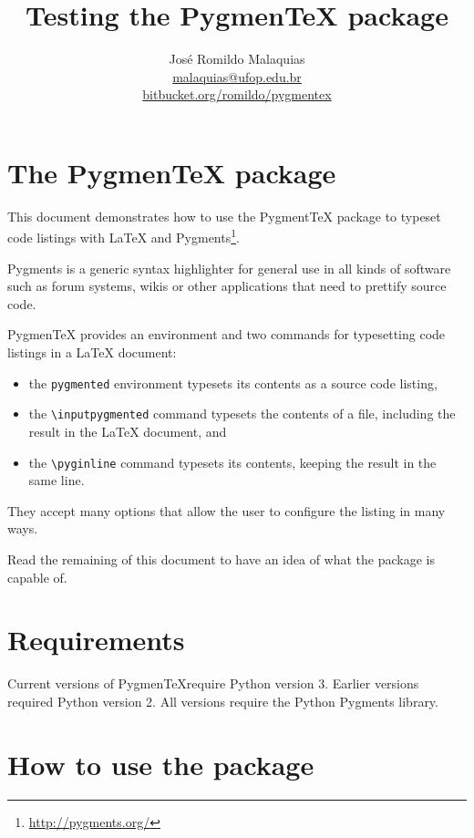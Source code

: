 \documentclass[10pt,a4paper]{article}
\begin{document}
\title{Testing the Pygmen\TeX{} package}
\author{José Romildo Malaquias\\
\href{mailto:malaquias@ufop.edu.br}{malaquias@ufop.edu.br}\\
\href{https://bitbucket.org/romildo/pygmentex/src/master/}{bitbucket.org/romildo/pygmentex}
}
\maketitle

\section{The Pygmen\TeX{} package}

This document demonstrates how to use the Pygment\TeX{} package to
typeset code listings with \LaTeX{} and
Pygments\footnote{\url{http://pygments.org/}}.

Pygments is a generic syntax highlighter for general use in all kinds of
software such as forum systems, wikis or other applications that need to
prettify source code.

Pygmen\TeX{} provides an environment and two commands for typesetting code
listings in a \LaTeX{} document:
\begin{itemize}
  \item the \verb|pygmented| environment typesets its contents as a
  source code listing,
  \item the \verb|\inputpygmented| command typesets the contents of a
  file, including the result in the \LaTeX{} document, and
  \item the \verb|\pyginline| command typesets its contents, keeping the
  result in the same line.
\end{itemize}
They accept many options that allow the user to configure the listing in
many ways.

Read the remaining of this document to have an idea of what the package
is capable of.

\section{Requirements}

Current versions of Pygmen\TeX require Python version 3.  Earlier versions
required Python version 2.  All versions require the Python Pygments library.

\section{How to use the package}
\end{document}
